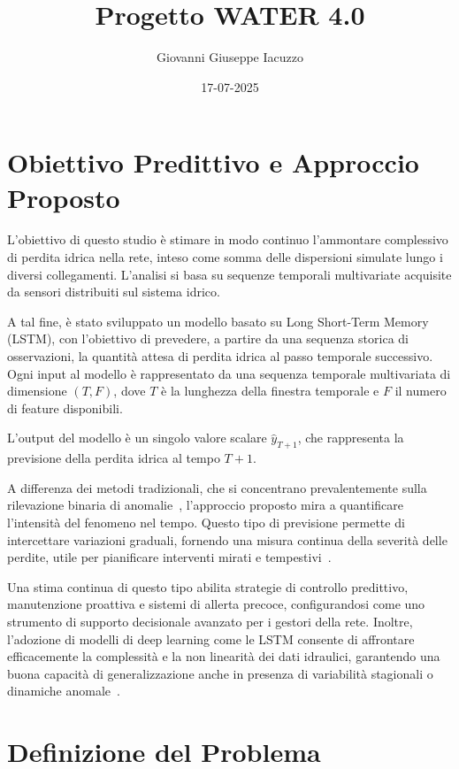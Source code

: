 \documentclass{article}
\title{Progetto WATER 4.0}
\author{Giovanni Giuseppe Iacuzzo}
\date{17-07-2025}
\begin{document}
\sloppy
\maketitle

\section{Obiettivo Predittivo e Approccio Proposto}

L'obiettivo di questo studio è stimare in modo continuo l’ammontare complessivo di perdita idrica 
nella rete, inteso come somma delle dispersioni simulate lungo i diversi collegamenti. L’analisi si 
basa su sequenze temporali multivariate acquisite da sensori distribuiti sul sistema idrico.

A tal fine, è stato sviluppato un modello basato su Long Short-Term Memory (LSTM), con l’obiettivo 
di prevedere, a partire da una sequenza storica di osservazioni, la quantità attesa di perdita 
idrica al passo temporale successivo. Ogni input al modello è rappresentato da una sequenza 
temporale multivariata di dimensione $(T, F)$, dove $T$ è la lunghezza della finestra temporale e 
$F$ il numero di feature disponibili.

L'output del modello è un singolo valore scalare $\hat{y}_{T+1}$, che rappresenta la previsione 
della perdita idrica al tempo $T+1$.

A differenza dei metodi tradizionali, che si concentrano prevalentemente sulla rilevazione binaria 
di anomalie~\cite{piller2020}, l’approccio proposto mira a quantificare l’intensità del fenomeno 
nel tempo. Questo tipo di previsione permette di intercettare variazioni graduali, fornendo una 
misura continua della severità delle perdite, utile per pianificare interventi mirati e 
tempestivi~\cite{candelieri2016, soldevila2016leak}.

Una stima continua di questo tipo abilita strategie di controllo predittivo, manutenzione proattiva 
e sistemi di allerta precoce, configurandosi come uno strumento di supporto decisionale avanzato 
per i gestori della rete. Inoltre, l’adozione di modelli di deep learning come le LSTM consente di 
affrontare efficacemente la complessità e la non linearità dei dati idraulici, garantendo una buona 
capacità di generalizzazione anche in presenza di variabilità stagionali o dinamiche anomale~\cite{bao2019}.

\section{Definizione del Problema}
\end{document}
